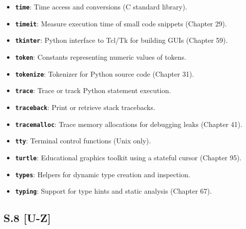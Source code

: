 \begin{itemize}
  (Chapter 27).
\item
  \textbf{\passthrough{\lstinline!time!}}: Time access and conversions
  (C standard library).
\item
  \textbf{\passthrough{\lstinline!timeit!}}: Measure execution time of
  small code snippets (Chapter 29).
\item
  \textbf{\passthrough{\lstinline!tkinter!}}: Python interface to Tcl/Tk
  for building GUIs (Chapter 59).
\item
  \textbf{\passthrough{\lstinline!token!}}: Constants representing
  numeric values of tokens.
\item
  \textbf{\passthrough{\lstinline!tokenize!}}: Tokenizer for Python
  source code (Chapter 31).
\item
  \textbf{\passthrough{\lstinline!trace!}}: Trace or track Python
  statement execution.
\item
  \textbf{\passthrough{\lstinline!traceback!}}: Print or retrieve stack
  tracebacks.
\item
  \textbf{\passthrough{\lstinline!tracemalloc!}}: Trace memory
  allocations for debugging leaks (Chapter 41).
\item
  \textbf{\passthrough{\lstinline!tty!}}: Terminal control functions
  (Unix only).
\item
  \textbf{\passthrough{\lstinline!turtle!}}: Educational graphics
  toolkit using a stateful cursor (Chapter 95).
\item
  \textbf{\passthrough{\lstinline!types!}}: Helpers for dynamic type
  creation and inspection.
\item
  \textbf{\passthrough{\lstinline!typing!}}: Support for type hints and
  static analysis (Chapter 67).
\end{itemize}

\hypertarget{s.8-u-z}{%
\subsection{S.8 {[}U-Z{]}}\label{s.8-u-z}}

